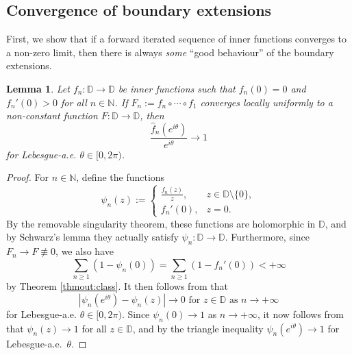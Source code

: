 \documentclass[a4paper,11pt]{article}
\theoremstyle{plain}
\newtheorem{lemma}{Lemma}[section]
\theoremstyle{definition}
\theoremstyle{definition}
\def\D{\mathbb{D}}
\begin{document}
\subsection{Convergence of boundary extensions} \label{ssec:boundary}
First, we show that if a forward iterated sequence of inner functions converges to a non-zero limit, then there is always \textit{some} ``good behaviour'' of the boundary extensions.
\begin{lemma} \label{lem:id}
Let $f_n:\D\to\D$ be inner functions such that $f_n(0) = 0$ and $f_n'(0) > 0$ for all $n\in\mathbb{N}$. If $F_n := f_n\circ\cdots\circ f_1$ converges locally uniformly to a non-constant function $F:\D\to\D$, then
\[ \frac{\hat{f}_n(e^{i\theta})}{e^{i\theta}} \to 1 \]
for Lebesgue-a.e. $\theta\in[0, 2\pi)$.
\end{lemma}
\begin{proof}
For $n\in\mathbb{N}$, define the functions
\[ \psi_n(z) := \begin{cases} \frac{f_n(z)}{z}, & z\in\D\setminus\{0\}, \\ f_n'(0), & z = 0. \end{cases} \]
By the removable singularity theorem, these functions are holomorphic in $\D$, and by Schwarz's lemma they actually satisfy $\psi_n:\D\to\D$. Furthermore, since $F_n\to F\not\equiv 0$, we also have
\[ \sum_{n\geq 1} (1 - \psi_n(0)) = \sum_{n\geq 1} (1 - f_n'(0)) < +\infty \]
by Theorem \ref{thmout:class}. It then follows from \cite[Theorem B]{BEFRS22} that
\[ \text{$|\psi_n(e^{i\theta}) - \psi_n(z)|\to 0$ for $z\in\D$ as $n\to+\infty$} \]
for Lebesgue-a.e. $\theta\in[0, 2\pi)$. Since $\psi_n(0)\to 1$ as $n\to +\infty$, it now follows from \cite[Theorem A]{BEFRS22} that $\psi_n(z)\to 1$ for all $z\in\mathbb{D}$, and by the triangle inequality $\psi_n(e^{i\theta})\to 1$ for Lebesgue-a.e.~$\theta$.
\end{proof}
\end{document}
